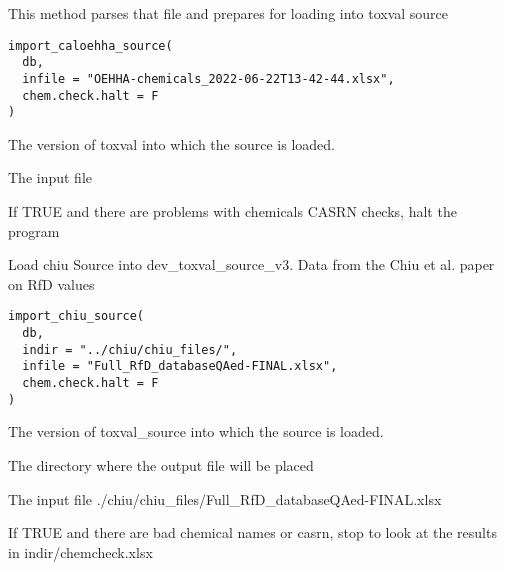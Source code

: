 \documentclass[letterpaper]{book}
\begin{document}
%
\begin{Description}\relax
This method parses that file and prepares for loading into toxval source
\end{Description}
%
\begin{Usage}
\begin{verbatim}
import_caloehha_source(
  db,
  infile = "OEHHA-chemicals_2022-06-22T13-42-44.xlsx",
  chem.check.halt = F
)
\end{verbatim}
\end{Usage}
%
\begin{Arguments}
\begin{ldescription}
\item[\code{db}] The version of toxval into which the source is loaded.

\item[\code{infile}] The input file

\item[\code{chem.check.halt}] If TRUE and there are problems with chemicals CASRN checks, halt the program
\end{ldescription}
\end{Arguments}
%
\begin{Description}\relax
Load chiu Source into dev\_toxval\_source\_v3.
Data from the Chiu et al. paper on RfD values
\end{Description}
%
\begin{Usage}
\begin{verbatim}
import_chiu_source(
  db,
  indir = "../chiu/chiu_files/",
  infile = "Full_RfD_databaseQAed-FINAL.xlsx",
  chem.check.halt = F
)
\end{verbatim}
\end{Usage}
%
\begin{Arguments}
\begin{ldescription}
\item[\code{db}] The version of toxval\_source into which the source is loaded.

\item[\code{indir}] The directory where the output file will be placed

\item[\code{infile}] The input file ./chiu/chiu\_files/Full\_RfD\_databaseQAed-FINAL.xlsx

\item[\code{chem.chek.halt}] If TRUE and there are bad chemical names or casrn,
stop to look at the results in indir/chemcheck.xlsx
\end{ldescription}
\end{Arguments}
\end{document}
